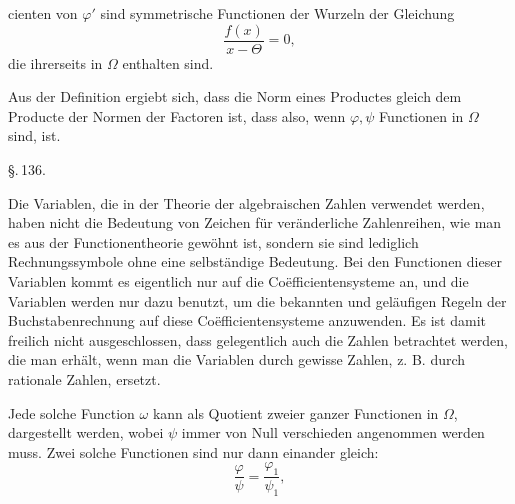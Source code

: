 cienten von $\varphi'$ sind symmetrische Functionen der Wurzeln der Gleichung
\[ \frac{f(x)}{x - \Theta} = 0, \]
die ihrerseits in $\Omega$ enthalten sind.

Aus der Definition ergiebt sich, dass die Norm eines Productes gleich dem Producte der Normen der Factoren ist, dass also, wenn $\varphi, \psi$ Functionen in $\Omega$ sind,
ist.

\begin{center}
\S.\,136.

\end{center}

Die Variablen, die in der Theorie der algebraischen Zahlen verwendet werden, haben nicht die Bedeutung von Zeichen f\"ur ver\"anderliche Zahlenreihen, wie man es aus der Functionentheorie gew\"ohnt ist, sondern sie sind lediglich Rechnungssymbole ohne eine selbst\"andige Bedeutung. Bei den Functionen dieser Variablen kommt es eigentlich nur auf die Co\"efficientensysteme an, und die Variablen werden nur dazu benutzt, um die bekannten und gel\"aufigen Regeln der Buchstabenrechnung auf diese Co\"efficientensysteme anzuwenden. Es ist damit freilich nicht ausgeschlossen, dass gelegentlich auch die Zahlen betrachtet werden, die man erh\"alt, wenn man die Variablen durch gewisse Zahlen, z. B. durch rationale Zahlen, ersetzt.


Jede solche Function $\omega$ kann als Quotient zweier ganzer Functionen in $\Omega$,
dargestellt werden, wobei $\psi$ immer von Null verschieden angenommen werden muss. Zwei solche Functionen sind nur dann einander gleich:
\[ \frac{\varphi}{\psi} = \frac{\varphi_1}{\psi_1}, \]
